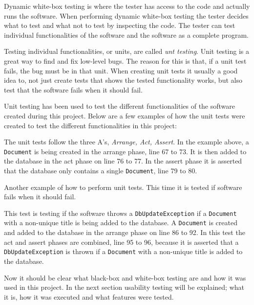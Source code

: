 Dynamic white-box testing is where the tester has access to the code and actually runs the software. %
When performing dynamic white-box testing the tester decides what to test and what not to test by inspecting the code.
The tester can test individual functionalities of the software and the software as a complete program. \cite{SoftwareTesting}

Testing individual functionalities, or units, are called \textit{unt testing}.
Unit testing is a great way to find and fix low-level bugs.
The reason for this is that, if a unit test fails, the bug must be in that unit.
When creating unit tests it usually a good idea to, not just create tests that shows the tested functionality works, but also test that the software fails when it should fail. \cite{SoftwareTesting}

Unit testing has been used to test the different functionalities of the software created during this project.
Below are a few examples of how the unit tests were created to test the different functionalities in this project:


The unit tests follow the three A's, \textit{Arrange, Act, Assert}.
In the example above, a \texttt{Document} is being created in the arrange phase, line 67 to 73.
It is then added to the database in the act phase on line 76 to 77.
In the assert phase it is asserted that the database only contains a single \texttt{Document}, line 79 to 80.

Another example of how to perform unit tests.
This time it is tested if software fails when it should fail.


This test is testing if the software throws a \texttt{DbUpdateException} if a \texttt{Document} with a non-unique title is being added to the database.
A \texttt{Document} is created and added to the database in the arrange phase on line 86 to 92.
In this test the act and assert phases are combined, line 95 to 96, because it is asserted that a \texttt{DbUpdateException} is thrown if a \texttt{Document} with a non-unique title is added to the database.


Now it should be clear what black-box and white-box testing are and how it was used in this project.
In the next section usability testing will be explained; what it is, how it was executed and what features were tested.
